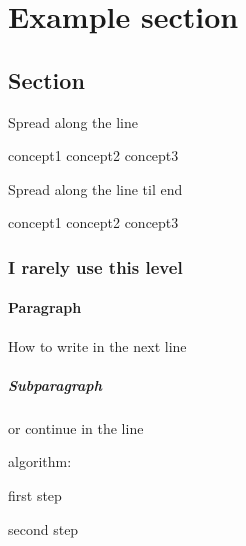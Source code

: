 
%
%
%

\section{Example section}

\subsection{Section}
Spread along the line

concept1
\hfil
concept2
\hfil
concept3

Spread along the line til end

concept1
\hfill
concept2
\hfill
concept3

\subsubsection{I rarely use this level}

\paragraph{Paragraph}\mbox{}

How to write in the next line

\subparagraph{Subparagraph}
or continue in the line

algorithm:
\begin{algo}
	\item first step
	\item second step
\end{algo}

